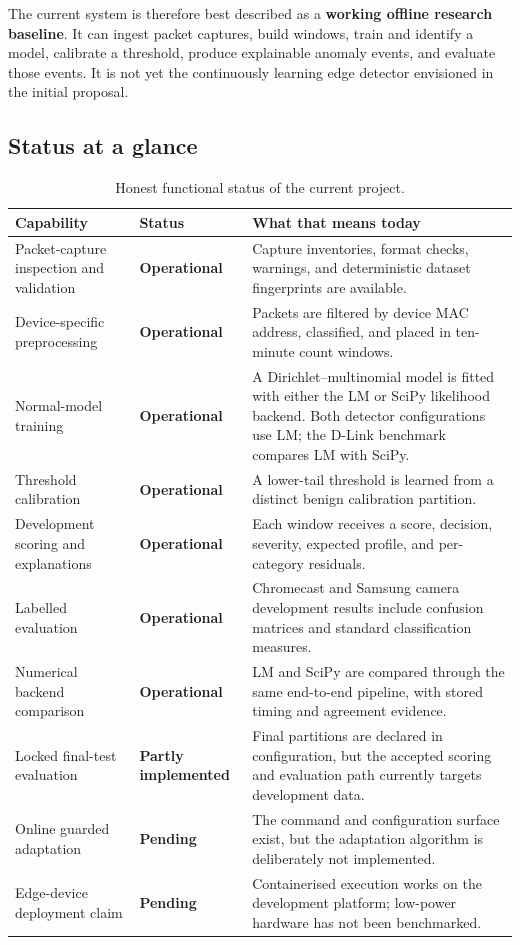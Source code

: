 \documentclass[11pt,a4paper]{article}
\newcommand{\operational}{\textcolor{workinggreen}{\textbf{Operational}}}
\newcommand{\partlyimplemented}{\textcolor{partialorange}{\textbf{Partly implemented}}}
\newcommand{\pending}{\textcolor{pendingred}{\textbf{Pending}}}
\begin{document}
The current system is therefore best described as a \textbf{working offline research baseline}. It can ingest packet captures, build windows, train and identify a model, calibrate a threshold, produce explainable anomaly events, and evaluate those events. It is not yet the continuously learning edge detector envisioned in the initial proposal.

\subsection{Status at a glance}

\begin{table}[ht]
\centering
\small
\begin{tabularx}{\textwidth}{>{\raggedright\arraybackslash}p{} >{\raggedright\arraybackslash}p{} X}
\toprule
\textbf{Capability} & \textbf{Status} & \textbf{What that means today} \\
\midrule
Packet-capture inspection and validation & \operational & Capture inventories, format checks, warnings, and deterministic dataset fingerprints are available. \\
Device-specific preprocessing & \operational & Packets are filtered by device MAC address, classified, and placed in ten-minute count windows. \\
Normal-model training & \operational & A Dirichlet--multinomial model is fitted with either the LM or SciPy likelihood backend. Both detector configurations use LM; the D-Link benchmark compares LM with SciPy. \\
Threshold calibration & \operational & A lower-tail threshold is learned from a distinct benign calibration partition. \\
Development scoring and explanations & \operational & Each window receives a score, decision, severity, expected profile, and per-category residuals. \\
Labelled evaluation & \operational & Chromecast and Samsung camera development results include confusion matrices and standard classification measures. \\
Numerical backend comparison & \operational & LM and SciPy are compared through the same end-to-end pipeline, with stored timing and agreement evidence. \\
Locked final-test evaluation & \partlyimplemented & Final partitions are declared in configuration, but the accepted scoring and evaluation path currently targets development data. \\
Online guarded adaptation & \pending & The command and configuration surface exist, but the adaptation algorithm is deliberately not implemented. \\
Edge-device deployment claim & \pending & Containerised execution works on the development platform; low-power hardware has not been benchmarked. \\
\bottomrule
\end{tabularx}
\caption{Honest functional status of the current project.}
\label{tab:status}
\end{table}
\end{document}
